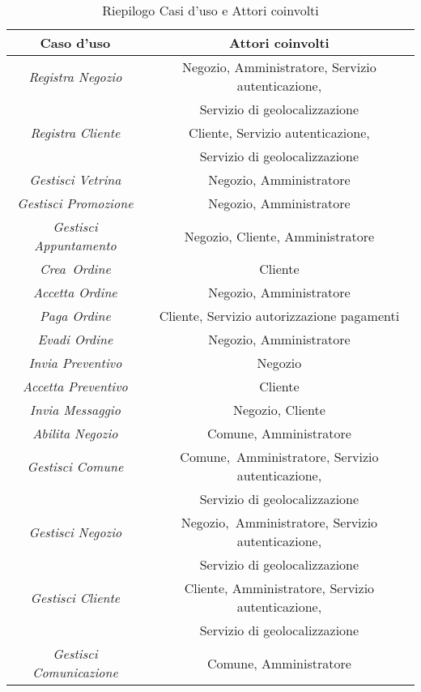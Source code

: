 \begin{table}[!htb]
    \centering
    \begin{tabular}{|c|c|} 
    \hline
    \textbf{Caso d'uso}             & \textbf{Attori coinvolti}                         \\ 
    \hline
    \textit{Registra Negozio}       & Negozio, Amministratore, Servizio autenticazione, \\ &Servizio di geolocalizzazione  \\ 
    \hline
    \textit{Registra Cliente}       & Cliente, Servizio autenticazione, \\ & Servizio di geolocalizzazione                  \\ 
    \hline
    \textit{Gestisci Vetrina}       & Negozio, Amministratore                           \\ 
    \hline
    \textit{Gestisci Promozione}    & Negozio, Amministratore                           \\ 
    \hline
    \textit{Gestisci Appuntamento}  & Negozio, Cliente, Amministratore                  \\ 
    \hline
    \textit{Crea~Ordine}            & Cliente                                           \\ 
    \hline
    \textit{Accetta Ordine}         & Negozio, Amministratore                           \\ 
    \hline
    \textit{Paga Ordine}            & Cliente, Servizio autorizzazione pagamenti        \\ 
    \hline
    \textit{Evadi Ordine}           & Negozio, Amministratore                           \\ 
    \hline
    \textit{Invia Preventivo}       & Negozio                                           \\ 
    \hline
    \textit{Accetta Preventivo}     & Cliente                                           \\ 
    \hline
    \textit{Invia Messaggio}        & Negozio, Cliente                                  \\ 
    \hline
    \textit{Abilita Negozio}        & Comune, Amministratore                            \\ 
    \hline
    \textit{Gestisci Comune}        & Comune,~Amministratore, Servizio autenticazione,\\ & Servizio di geolocalizzazione                            \\ 
    \hline
    \textit{Gestisci Negozio}       & Negozio,~Amministratore, Servizio autenticazione,\\ & Servizio di geolocalizzazione                           \\ 
    \hline
    \textit{Gestisci Cliente}       & Cliente, Amministratore, Servizio autenticazione, \\ &Servizio di geolocalizzazione                           \\ 
    \hline
    \textit{Gestisci Comunicazione} & Comune, Amministratore                            \\
    \hline
    \end{tabular}
    \caption{Riepilogo Casi d'uso e Attori coinvolti}
\end{table}


